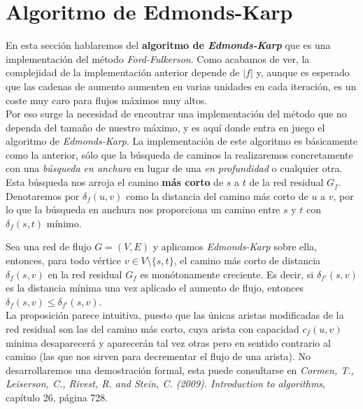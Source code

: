 \section{Algoritmo de Edmonds-Karp}

En esta sección hablaremos del \textbf{algoritmo de \textit{Edmonds-Karp}} que es una implementación del método \textit{Ford-Fulkerson}. Como acabamos de ver, la complejidad de la implementación anterior depende de $|f|$ y, aunque es esperado que las cadenas de aumento aumenten en varias unidades en cada iteración, es un coste muy caro para flujos máximos muy altos.\\

Por eso surge la necesidad de encontrar una implementación del método que no dependa del tamaño de nuestro máximo, y es aquí donde entra en juego el algoritmo de \textit{Edmonds-Karp}. La implementación de este algoritmo es básicamente como la anterior, sólo que la búsqueda de caminos la realizaremos concretamente con una \textit{búsqueda en anchura} en lugar de una \textit{en profundidad} o  cualquier otra.\\

Esta búsqueda nos arroja el camino \textbf{más corto} de $s$ a $t$ de la red residual $G_f$. Denotaremos por $\delta_f(u,v)$ como la distancia del camino más corto de $u$ a $v$, por lo que la búsqueda en anchura nos proporciona un camino entre $s$ y $t$ con $\delta_f(s,t)$ mínimo.

\begin{proposicion} Sea una red de flujo $G=(V,E)$ y aplicamos \textit{Edmonds-Karp} sobre ella, entonces, para todo vértice $v\in V\setminus\{s,t\}$, el camino más corto de distancia $\delta_f(s,v)$ en la red residual $G_f$ es monótonamente creciente. Es decir, si $\delta_{f'}(s,v)$ es la distancia mínima una vez aplicado el aumento de flujo, entonces $\delta_f(s,v)\leq \delta_{f'}(s,v)$.\\

La proposición parece intuitiva, puesto que las únicas aristas modificadas de la red residual son las del camino más corto, cuya arista con capacidad $c_f(u,v)$ mínima desaparecerá y aparecerán tal vez otras pero en sentido contrario al camino (las que nos sirven para decrementar el flujo de una arista). No desarrollaremos una demostración formal, esta puede consultarse en \textit{Cormen, T., Leiserson, C., Rivest, R. and Stein, C. (2009). Introduction to algorithms}, capítulo 26, página 728.
\end{proposicion}

